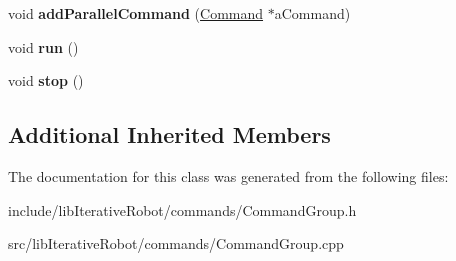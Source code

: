 \begin{DoxyCompactItemize}
void {\bfseries add\+Parallel\+Command} (\mbox{\hyperlink{classlib_iterative_robot_1_1_command}{Command}} $\ast$a\+Command)
\item 
\mbox{\label{classlib_iterative_robot_1_1_command_group_a9e76c6d0ef039eca4dc27dd2f0144485}} 
void {\bfseries run} ()
\item 
\mbox{\label{classlib_iterative_robot_1_1_command_group_ad521849c9a7f1b3f952b318ee424c5b9}} 
void {\bfseries stop} ()
\end{DoxyCompactItemize}
\subsection*{Additional Inherited Members}


The documentation for this class was generated from the following files\+:\begin{DoxyCompactItemize}
\item 
include/lib\+Iterative\+Robot/commands/Command\+Group.\+h\item 
src/lib\+Iterative\+Robot/commands/Command\+Group.\+cpp\end{DoxyCompactItemize}
